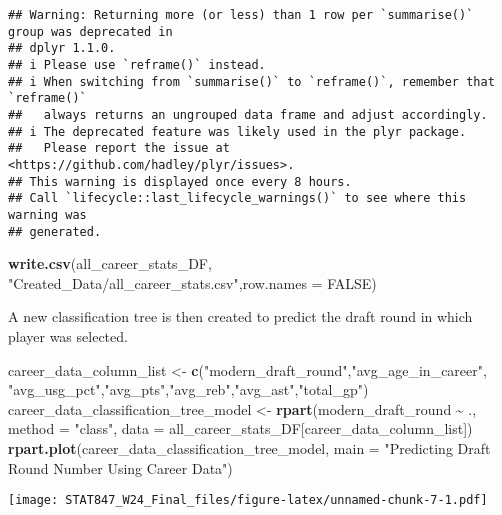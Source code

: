 \documentclass[
]{article}
\newenvironment{Shaded}{\begin{snugshade}}{\end{snugshade}}
\newcommand{\AttributeTok}[1]{\textcolor[rgb]{0.13,0.29,0.53}{#1}}
\newcommand{\ConstantTok}[1]{\textcolor[rgb]{0.56,0.35,0.01}{#1}}
\newcommand{\FunctionTok}[1]{\textcolor[rgb]{0.13,0.29,0.53}{\textbf{#1}}}
\newcommand{\NormalTok}[1]{#1}
\newcommand{\OtherTok}[1]{\textcolor[rgb]{0.56,0.35,0.01}{#1}}
\newcommand{\SpecialCharTok}[1]{\textcolor[rgb]{0.81,0.36,0.00}{\textbf{#1}}}
\newcommand{\StringTok}[1]{\textcolor[rgb]{0.31,0.60,0.02}{#1}}
\begin{document}
\begin{verbatim}
## Warning: Returning more (or less) than 1 row per `summarise()` group was deprecated in
## dplyr 1.1.0.
## i Please use `reframe()` instead.
## i When switching from `summarise()` to `reframe()`, remember that `reframe()`
##   always returns an ungrouped data frame and adjust accordingly.
## i The deprecated feature was likely used in the plyr package.
##   Please report the issue at <https://github.com/hadley/plyr/issues>.
## This warning is displayed once every 8 hours.
## Call `lifecycle::last_lifecycle_warnings()` to see where this warning was
## generated.
\end{verbatim}

\begin{Shaded}
\begin{Highlighting}[]
\FunctionTok{write.csv}\NormalTok{(all\_career\_stats\_DF,}
          \StringTok{"Created\_Data/all\_career\_stats.csv"}\NormalTok{,}\AttributeTok{row.names =} \ConstantTok{FALSE}\NormalTok{)}
\end{Highlighting}
\end{Shaded}

A new classification tree is then created to predict the draft round in
which player was selected.

\begin{Shaded}
\begin{Highlighting}[]
\NormalTok{career\_data\_column\_list }\OtherTok{\textless{}{-}} \FunctionTok{c}\NormalTok{(}\StringTok{"modern\_draft\_round"}\NormalTok{,}\StringTok{"avg\_age\_in\_career"}\NormalTok{,}
                        \StringTok{"avg\_usg\_pct"}\NormalTok{,}\StringTok{"avg\_pts"}\NormalTok{,}\StringTok{"avg\_reb"}\NormalTok{,}\StringTok{"avg\_ast"}\NormalTok{,}\StringTok{"total\_gp"}\NormalTok{)}
\NormalTok{career\_data\_classification\_tree\_model }\OtherTok{\textless{}{-}} \FunctionTok{rpart}\NormalTok{(modern\_draft\_round }\SpecialCharTok{\textasciitilde{}}\NormalTok{ ., }
              \AttributeTok{method =} \StringTok{"class"}\NormalTok{, }\AttributeTok{data =}\NormalTok{ all\_career\_stats\_DF[career\_data\_column\_list])}
\FunctionTok{rpart.plot}\NormalTok{(career\_data\_classification\_tree\_model, }
           \AttributeTok{main =} \StringTok{"Predicting Draft Round Number Using Career Data"}\NormalTok{)}
\end{Highlighting}
\end{Shaded}

\texttt{[image: STAT847\_W24\_Final\_files/figure-latex/unnamed-chunk-7-1.pdf]}
\end{document}
